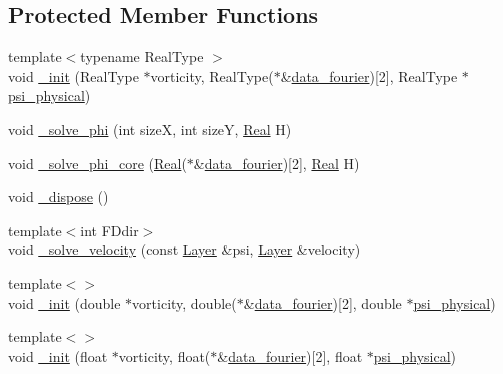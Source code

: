 \subsection*{Protected Member Functions}
\begin{DoxyCompactItemize}
\item 
{\footnotesize template$<$typename Real\+Type $>$ }\\void \hyperlink{class_velocity_solver___f_f_t_w_abdfd608707a973bbbf83a1c3fabec7c7}{\+\_\+init} (Real\+Type $\ast$vorticity, Real\+Type($\ast$\&\hyperlink{class_velocity_solver___f_f_t_w_a589908f23d4caf65f23017d816c81dce}{data\+\_\+fourier})\mbox{[}2\mbox{]}, Real\+Type $\ast$\hyperlink{class_velocity_solver___f_f_t_w_ac0176cfda775251bb353dc0fdd3a21a4}{psi\+\_\+physical})
\item 
void \hyperlink{class_velocity_solver___f_f_t_w_a58ab8fe9aebab8bbdb516fdfd527848a}{\+\_\+solve\+\_\+phi} (int size\+X, int size\+Y, \hyperlink{_h_d_f5_dumper_8h_a445a5f0e2a34c9d97d69a3c2d1957907}{Real} H)
\item 
void \hyperlink{class_velocity_solver___f_f_t_w_a91285c45bc852d516b7ce421669f0b35}{\+\_\+solve\+\_\+phi\+\_\+core} (\hyperlink{_h_d_f5_dumper_8h_a445a5f0e2a34c9d97d69a3c2d1957907}{Real}($\ast$\&\hyperlink{class_velocity_solver___f_f_t_w_a589908f23d4caf65f23017d816c81dce}{data\+\_\+fourier})\mbox{[}2\mbox{]}, \hyperlink{_h_d_f5_dumper_8h_a445a5f0e2a34c9d97d69a3c2d1957907}{Real} H)
\item 
void \hyperlink{class_velocity_solver___f_f_t_w_ae093f8304949af0da930801698b00b87}{\+\_\+dispose} ()
\item 
{\footnotesize template$<$int F\+Ddir$>$ }\\void \hyperlink{class_velocity_solver___f_f_t_w_aa21455721c66e3c1ccb3f500ca25e769}{\+\_\+solve\+\_\+velocity} (const \hyperlink{struct_layer}{Layer} \&psi, \hyperlink{struct_layer}{Layer} \&velocity)
\item 
{\footnotesize template$<$$>$ }\\void \hyperlink{class_velocity_solver___f_f_t_w_a53606eb60568de76bc3e1e10fc1058f0}{\+\_\+init} (double $\ast$vorticity, double($\ast$\&\hyperlink{class_velocity_solver___f_f_t_w_a589908f23d4caf65f23017d816c81dce}{data\+\_\+fourier})\mbox{[}2\mbox{]}, double $\ast$\hyperlink{class_velocity_solver___f_f_t_w_ac0176cfda775251bb353dc0fdd3a21a4}{psi\+\_\+physical})
\item 
{\footnotesize template$<$$>$ }\\void \hyperlink{class_velocity_solver___f_f_t_w_a19b4ffcddba24dd983bfea58870e8718}{\+\_\+init} (float $\ast$vorticity, float($\ast$\&\hyperlink{class_velocity_solver___f_f_t_w_a589908f23d4caf65f23017d816c81dce}{data\+\_\+fourier})\mbox{[}2\mbox{]}, float $\ast$\hyperlink{class_velocity_solver___f_f_t_w_ac0176cfda775251bb353dc0fdd3a21a4}{psi\+\_\+physical})
\end{DoxyCompactItemize}
